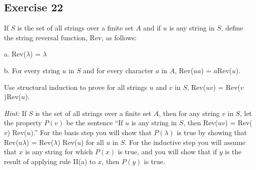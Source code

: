 \documentclass[14pt]{extarticle}
\begin{document}
\subsection{Exercise 22}
If $S$ is the set of all strings over a finite set $A$ and if $u$ is any string in $S$, define the string reversal function, Rev, as follows:

a. Rev($\lambda$) = $\lambda$

b. For every string $u$ in $S$ and for every character $a$ in $A$, Rev($ua$) = $a$Rev($u$).

Use structural induction to prove for all strings $u$ and $v$ in $S$, Rev($uv$) = Rev($v$)Rev($u$).

    {\it Hint:} If $S$ is the set of all strings over a finite set $A$, then for any string $v$ in $S$, let the property
$P(v)$ be the sentence “If $u$ is any string in $S$, then Rev($uv$) = Rev($v$) Rev($u$).” For the basis step you
will show that $P(\lambda)$ is true by showing that Rev($u \lambda$) = Rev($\lambda$) Rev($u$) for all $u$ in $S$. For
the inductive step you will assume that $x$ is any string for which $P(x)$ is true, and you will show that if $y$ is
the result of applying rule II(a) to $x$, then $P(y)$ is true.
\end{document}
